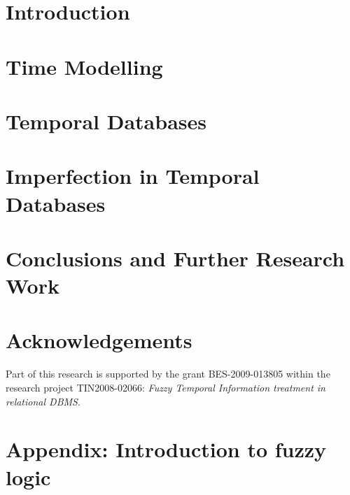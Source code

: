 \documentclass[graybox]{svmult}
\begin{document}
\section{Introduction}
\label{sec:introduction}


\section{Time Modelling}
\label{sec:time-domain}

\def\JPicScale{1}
\section{Temporal Databases}
\label{sec:temporal-databases}

\def\JPicScale{1}
\section{Imperfection in Temporal Databases}
\label{sec:imprecision-uncertainty}


%
\def\JPicScale{1}
\section{Conclusions and Further Research Work}
\label{sec:further-research-work}

\def\JPicScale{1}
\section*{Acknowledgements}
Part of this research is supported by the grant BES-2009-013805 within the research project TIN2008-02066: \emph{Fuzzy Temporal Information treatment in relational DBMS}.



\def\JPicScale{0.5}


\newpage
\section*{Appendix: Introduction to fuzzy logic}
\label{app:fuzzy-logic}

\end{document}
